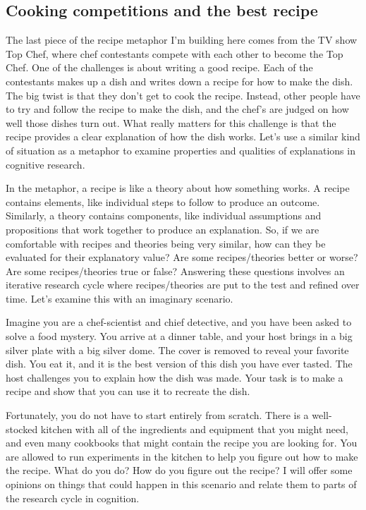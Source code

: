 \documentclass[
  oneside,
  12pt]{crumpbook}
\begin{document}
\hypertarget{cooking-competitions-and-the-best-recipe}{%
\subsection{Cooking competitions and the best recipe}\label{cooking-competitions-and-the-best-recipe}}

The last piece of the recipe metaphor I'm building here comes from the TV show Top Chef, where chef contestants compete with each other to become the Top Chef. One of the challenges is about writing a good recipe. Each of the contestants makes up a dish and writes down a recipe for how to make the dish. The big twist is that they don't get to cook the recipe. Instead, other people have to try and follow the recipe to make the dish, and the chef's are judged on how well those dishes turn out. What really matters for this challenge is that the recipe provides a clear explanation of how the dish works. Let's use a similar kind of situation as a metaphor to examine properties and qualities of explanations in cognitive research.

In the metaphor, a recipe is like a theory about how something works. A recipe contains elements, like individual steps to follow to produce an outcome. Similarly, a theory contains components, like individual assumptions and propositions that work together to produce an explanation. So, if we are comfortable with recipes and theories being very similar, how can they be evaluated for their explanatory value? Are some recipes/theories better or worse? Are some recipes/theories true or false? Answering these questions involves an iterative research cycle where recipes/theories are put to the test and refined over time. Let's examine this with an imaginary scenario.

Imagine you are a chef-scientist and chief detective, and you have been asked to solve a food mystery. You arrive at a dinner table, and your host brings in a big silver plate with a big silver dome. The cover is removed to reveal your favorite dish. You eat it, and it is the best version of this dish you have ever tasted. The host challenges you to explain how the dish was made. Your task is to make a recipe and show that you can use it to recreate the dish.

Fortunately, you do not have to start entirely from scratch. There is a well-stocked kitchen with all of the ingredients and equipment that you might need, and even many cookbooks that might contain the recipe you are looking for. You are allowed to run experiments in the kitchen to help you figure out how to make the recipe. What do you do? How do you figure out the recipe? I will offer some opinions on things that could happen in this scenario and relate them to parts of the research cycle in cognition.
\end{document}
